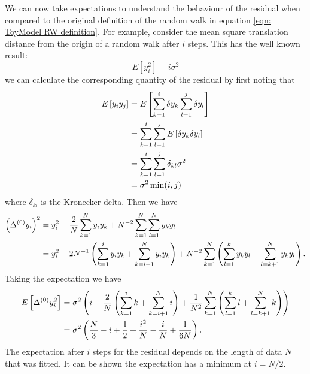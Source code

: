 

We can now take expectations to understand the behaviour of the residual when
compared to the original definition of the random
walk in equation \ref{eqn: ToyModel RW definition}. For example, consider
the mean square translation distance from the origin of a random walk after $i$
steps. This has the well known result:
\begin{equation}
E[y_{i}^{2}] = i \sigma^{2}
\end{equation}
we can calculate the corresponding quantity of the residual by first noting
that
\begin{align}
E\left[y_{i}y_{j}\right] & = E\left[\sum_{k=1}^{i}\delta y_{k} \sum_{l=1}^{j}\delta y_{l} \right] \\
& = \sum_{k=1}^{i}\sum_{l=1}^{j}E\left[\delta y_{k} \delta y_{l}\right] \\
& = \sum_{k=1}^{i}\sum_{l=1}^{j} \delta_{kl} \sigma^{2} \\
& = \sigma^{2}\min(i, j)
\end{align}
where $\delta_{kl}$ is the Kronecker delta. Then we have
\begin{align}
\left(\Delta^{(0)} y_{i}\right)^{2} & = y_{i}^{2} - \frac{2}{N}\sum_{k=1}^{N}y_{i}y_{k} + N^{-2}\sum_{k=1}^{N}\sum_{l=1}^{N}y_{k}y_{l} \\
& =  y_{i}^{2} - 2 N^{-1} \left(\sum_{k=1}^{i}y_{i}y_{k} + \sum_{k=i+1}^{N}y_{i}y_{k} \right)+ N^{-2}\sum_{k=1}^{N}\left(\sum_{l=1}^{k}y_{k}y_{l} + \sum_{l=k+1}^{N}y_{k}y_{l} \right).
\end{align}
Taking the expectation we have
\begin{align}
E\left[\Delta^{(0)} y_{i}^{2} \right] & = \sigma^{2}\left(i - \frac{2}{N}\left(\sum_{k=1}^{i}k + \sum_{k=i+1}^{N}i \right)+ \frac{1}{N^{2}}\sum_{k=1}^{N}\left(\sum_{l=1}^{k}l+ \sum_{l=k+1}^{N}k \right) \right) \\
& = \sigma^{2}\left(\frac{N}{3} - i + \frac{1}{2} + \frac{i^{2}}{N} - \frac{i}{N} + \frac{1}{6 N}\right).
\end{align}
The expectation after $i$ steps for the residual depends on the length of data
$N$ that was fitted. It can be shown the expectation has a minimum at $i=N/2$.

